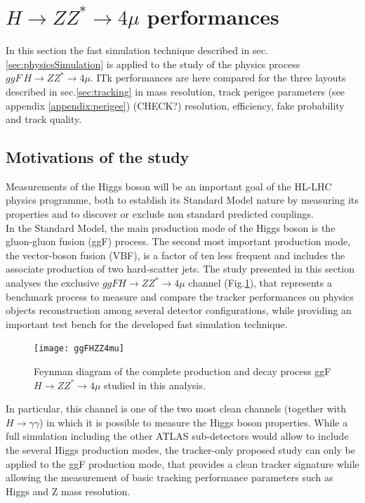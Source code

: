 \documentclass[a4paper,twoside,12pt]{article}
\begin{document}
\clearpage

\section{$H \rightarrow ZZ^* \rightarrow 4\mu$ performances}
In this section the fast simulation technique described in sec.\ref{sec:physicsSimulation} is
applied to the study of the physics process $ggF\ H \rightarrow ZZ^* \rightarrow 4\mu$. ITk performances are here compared for the three layouts described in sec.\ref{sec:tracking} 
in mass resolution, track perigee parameters (see appendix \ref{appendix:perigee}) (CHECK?) resolution, efficiency, fake probability
and track quality.\\

\subsection{Motivations of the study}
Measurements of the Higgs boson will be an important goal of the HL-LHC physics programme, both to establish its Standard Model nature by measuring its properties and to 
discover or exclude non standard predicted couplings. \\

In the Standard Model, the main 
production mode of the Higgs boson is the gluon-gluon fusion (ggF) process. The second most 
important production mode, the vector-boson fusion (VBF), is a factor of ten less frequent and includes the associate
production of two hard-scatter jets. The study presented in this section analyses the exclusive
$ggF H \rightarrow ZZ^* \rightarrow 4\mu$ channel (Fig.\ref{fig:ggFHZZ4mu}), that represents a benchmark process to measure and compare the tracker performances on physics objects reconstruction among several detector
configurations, while providing an important test bench for the developed fast simulation technique.\\

\begin{figure} [h]
	\centering
	\texttt{[image: ggFHZZ4mu]}
	\caption{Feynman diagram of the complete production and decay process 
	ggF $H \rightarrow ZZ^* \rightarrow 4\mu$ studied in 
	this analysis.}
	\label{fig:ggFHZZ4mu}
\end{figure}

In particular, this channel is one of the two most clean channels (together with $H \rightarrow \gamma\gamma$) in which it is possible to measure the Higgs boson properties. While a full 
simulation including the other ATLAS sub-detectors would allow to include the several Higgs
production modes, the tracker-only proposed study can only
be applied to the ggF production mode, that provides a clean tracker signature while
allowing the measurement of basic tracking performance parameters such as Higgs and Z mass resolution.
\end{document}
